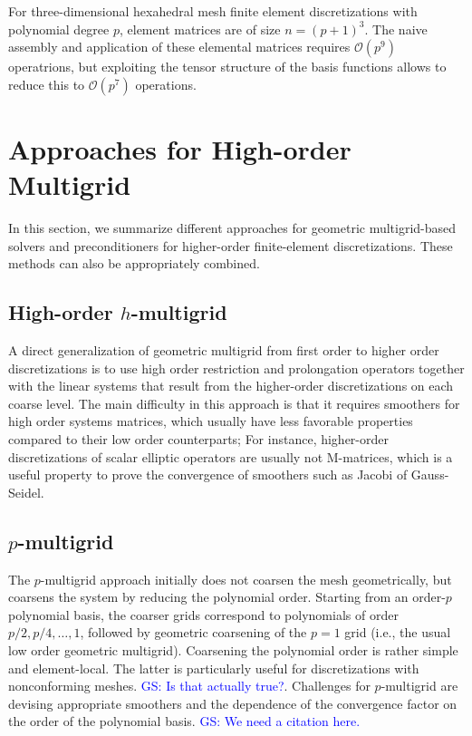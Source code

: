 \documentclass[times]{nlaauth}
\newcommand{\gsnote}[1]{\textcolor{blue}{GS: #1}}
\begin{document}
For three-dimensional hexahedral mesh finite element discretizations
with polynomial degree $p$, element matrices are of size
$n=(p+1)^3$. The naive assembly and application of these elemental
matrices requires $\mathcal O(p^9)$ operatrions, but exploiting the
tensor structure of the basis functions allows to reduce this to
$\mathcal O(p^7)$ operations.


\section{Approaches for High-order Multigrid}


In this section, we summarize different approaches for geometric
multigrid-based solvers and preconditioners for higher-order
finite-element discretizations. These methods can also be
appropriately combined.

\subsection{High-order $h$-multigrid}
A direct generalization of geometric multigrid from first order to
higher order discretizations is to use high order restriction and
prolongation operators together with the linear systems that result
from the higher-order discretizations on each coarse level.  The main
difficulty in this approach is that it requires smoothers for high
order systems matrices, which usually have less favorable properties
compared to their low order counterparts; For instance, higher-order
discretizations of scalar elliptic operators are usually not
M-matrices, which is a useful property to prove the convergence of
smoothers such as Jacobi of Gauss-Seidel.


\subsection{$p$-multigrid}
The $p$-multigrid approach initially does not coarsen the mesh
geometrically, but coarsens the system by reducing the polynomial
order. Starting from an order-$p$ polynomial basis, the coarser grids
correspond to polynomials of order $p/2, p/4,\ldots,1$, followed by
geometric coarsening of the $p=1$ grid (i.e., the usual low order
geometric multigrid). Coarsening the polynomial order is rather simple
and element-local. The latter is particularly useful for
discretizations with nonconforming meshes. \gsnote{Is that actually
  true?}. Challenges for $p$-multigrid are devising appropriate
smoothers and the dependence of the convergence factor on the order of
the polynomial basis. \gsnote{We need a citation here.}
\end{document}
